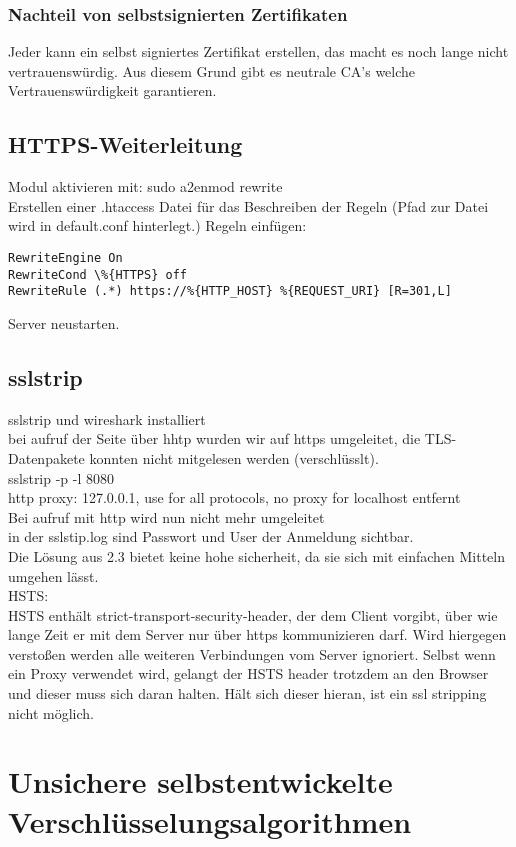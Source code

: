\documentclass[12pt]{article}
\theoremstyle{plain}
\begin{document}
\subsubsection{Nachteil von selbstsignierten Zertifikaten}
Jeder kann ein selbst signiertes Zertifikat erstellen, das macht es noch lange nicht vertrauenswürdig. Aus diesem Grund gibt es neutrale CA's welche Vertrauenswürdigkeit garantieren.
\subsection{HTTPS-Weiterleitung}
Modul aktivieren mit: sudo a2enmod rewrite\\
Erstellen einer .htaccess Datei für das Beschreiben der Regeln (Pfad zur Datei wird in default.conf hinterlegt.) Regeln einfügen:\\
\begin{verbatim}
RewriteEngine On
RewriteCond \%{HTTPS} off
RewriteRule (.*) https://%{HTTP_HOST} %{REQUEST_URI} [R=301,L] 
\end{verbatim}
Server neustarten.
\subsection{sslstrip}
sslstrip und wireshark installiert\\
bei aufruf der Seite über hhtp wurden wir auf https umgeleitet, die TLS-Datenpakete konnten nicht mitgelesen werden (verschlüsslt).\\
sslstrip -p -l 8080\\
http proxy: 127.0.0.1, use for all protocols, no proxy for localhost entfernt\\
Bei aufruf mit http wird nun nicht mehr umgeleitet\\
in der sslstip.log sind Passwort und User der Anmeldung sichtbar.\\
Die Lösung aus 2.3 bietet keine hohe sicherheit, da sie sich mit einfachen Mitteln umgehen lässt.\\
HSTS:\\
HSTS enthält strict-transport-security-header, der dem Client vorgibt, über wie lange Zeit er mit dem Server nur über https kommunizieren darf. Wird hiergegen verstoßen werden alle weiteren Verbindungen vom Server ignoriert. Selbst wenn ein Proxy verwendet wird, gelangt der HSTS header trotzdem an den Browser und dieser muss sich daran halten. Hält sich dieser hieran, ist ein ssl stripping nicht möglich.
\section{Unsichere selbstentwickelte Verschlüsselungsalgorithmen}
\end{document}
